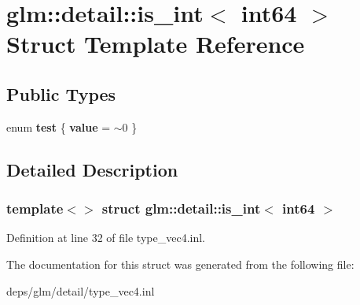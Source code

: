 \hypertarget{structglm_1_1detail_1_1is__int_3_01int64_01_4}{}\section{glm\+:\+:detail\+:\+:is\+\_\+int$<$ int64 $>$ Struct Template Reference}
\label{structglm_1_1detail_1_1is__int_3_01int64_01_4}
\subsection*{Public Types}
\begin{DoxyCompactItemize}
\item 
\mbox{\label{structglm_1_1detail_1_1is__int_3_01int64_01_4_a6d738b326fc92804b0cffae571ac3e7f}} 
enum {\bfseries test} \{ {\bfseries value} = $\sim$0
 \}
\end{DoxyCompactItemize}


\subsection{Detailed Description}
\subsubsection*{template$<$$>$\newline
struct glm\+::detail\+::is\+\_\+int$<$ int64 $>$}



Definition at line 32 of file type\+\_\+vec4.\+inl.



The documentation for this struct was generated from the following file\+:\begin{DoxyCompactItemize}
\item 
deps/glm/detail/type\+\_\+vec4.\+inl\end{DoxyCompactItemize}
